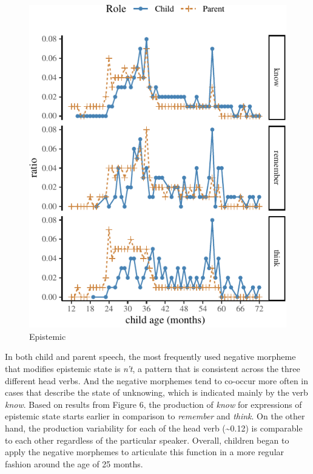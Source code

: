 \documentclass[10pt, letterpaper]{article}
\newenvironment{CodeChunk}{}{}
\begin{document}
\begin{CodeChunk}
\begin{figure}[H]

{\centering \includegraphics{figs/epistemic-1} 

}

\caption[Epistemic]{Epistemic}\label{fig:epistemic}
\end{figure}
\end{CodeChunk}

In both child and parent speech, the most frequently used negative
morpheme that modifies epistemic state is \emph{n't}, a pattern that is
consistent across the three different head verbs. And the negative
morphemes tend to co-occur more often in cases that describe the state
of unknowing, which is indicated mainly by the verb \emph{know}. Based
on results from Figure 6, the production of \emph{know} for expressions
of epistemic state starts earlier in comparison to \emph{remember} and
\emph{think}. On the other hand, the production variability for each of
the head verb (\textasciitilde0.12) is comparable to each other
regardless of the particular speaker. Overall, children began to apply
the negative morphemes to articulate this function in a more regular
fashion around the age of 25 months.
\end{document}
